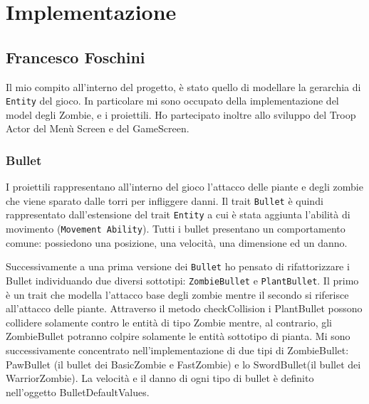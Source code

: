 \newpage
\section{Implementazione}


\subsection{Francesco Foschini}
Il mio compito all'interno del progetto, è stato quello di modellare la gerarchia di \texttt{Entity} del gioco.
In particolare mi sono occupato della implementazione del model degli Zombie, e i proiettili.
Ho partecipato inoltre allo sviluppo del Troop Actor del Menù Screen e del GameScreen.

\subsubsection{Bullet}
I proiettili rappresentano all'interno del gioco l'attacco delle piante e degli zombie che viene sparato dalle torri
per infliggere danni. Il trait \texttt{Bullet} è quindi rappresentato dall'estensione del
trait \texttt{Entity} a cui è stata aggiunta l'abilità di movimento (\texttt{Movement Ability}).
Tutti i bullet presentano un comportamento comune: possiedono una posizione, una velocità, una dimensione ed un danno.

Successivamente a una prima versione dei \texttt{Bullet} ho pensato di rifattorizzare i Bullet individuando due diversi sottotipi: \texttt{ZombieBullet} e \texttt{PlantBullet}.
Il primo è un trait che modella l'attacco base degli zombie mentre il secondo si riferisce all'attacco delle piante.
Attraverso il metodo checkCollision i PlantBullet possono collidere solamente contro le entità di tipo Zombie mentre,
al contrario, gli ZombieBullet potranno colpire solamente le entità sottotipo di pianta.
Mi sono successivamente concentrato nell'implementazione di due tipi di ZombieBullet: PawBullet (il bullet dei
BasicZombie e FastZombie) e lo SwordBullet(il bullet dei WarriorZombie).
La velocità e il danno di ogni tipo di bullet è definito nell'oggetto BulletDefaultValues.